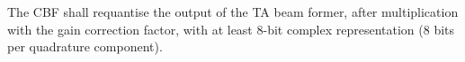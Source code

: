 The CBF shall requantise the output of the TA beam former, after
multiplication with the gain correction factor, with at least 8-bit complex
representation (8 bits per quadrature component).
